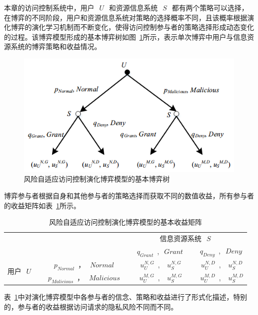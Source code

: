 本章的访问控制系统中，用户~$~U~$~和资源信息系统~$~S~$~都有两个策略可以选择，在博弈的不同阶段，用户和资源信息系统对策略的选择概率不同，且该概率根据演化博弈的演化学习机制而不断变化，使得访问控制参与者的策略选择形成动态变化的过程。该博弈模型形成的基本博弈树如图~\ref{fig:game-tree}所示，表示单次博弈中用户与信息资源系统的博弈策略和收益情况。

\begin{figure}[htbp]
	\centering
	\includegraphics[width = 0.6\linewidth]{./figures/game-tree.png}
	\caption{风险自适应访问控制演化博弈模型的基本博弈树}
	\label{fig:game-tree}
\end{figure}

博弈参与者根据自身和其他参与者的策略选择而获取不同的数值收益，所有参与者的收益矩阵如表~\ref{tab:privacy-utilities-matrix}所示。

\begin{table}[htbp]
	\caption{风险自适应访问控制演化博弈模型的基本收益矩阵}
	\label{tab:privacy-utilities-matrix}
	\centering
	\begin{tabular}{cccc}%
		
		\toprule
		\textbf{ }&\textbf{ }&\multicolumn{2}{c}{信息资源系统~$~S~$~}\\
		\textbf{ }&\textbf{ }& ~$~q_{Grant}$~,~$~Grant~$~&~$~q_{Deny}$~,~$~Deny~$\\
		\midrule
		\multirow{2}{*}{用户~$~U~$~} & ~$~p_{Normal}$~，~$~Normal~$~ &~$~u_U^{N,G}$~, ~$~u_S^{N,G}$~ & ~$~u_U^{N,D}$~, ~$~u_S^{N,D}$\\
		& ~$~p_{Malicious}$~，~$~Malicious~$~ &~$~u_U^{M,G}$~, ~$~u_S^{M,G}$~ & ~$~u_U^{M,D}$~, ~$~u_S^{M,D}$\\
		\bottomrule
	\end{tabular}
\end{table}

表~\ref{tab:privacy-utilities-matrix}中对演化博弈模型中各参与者的信念、策略和收益进行了形式化描述，特别的，参与者的收益根据访问请求的隐私风险不同而不同。


